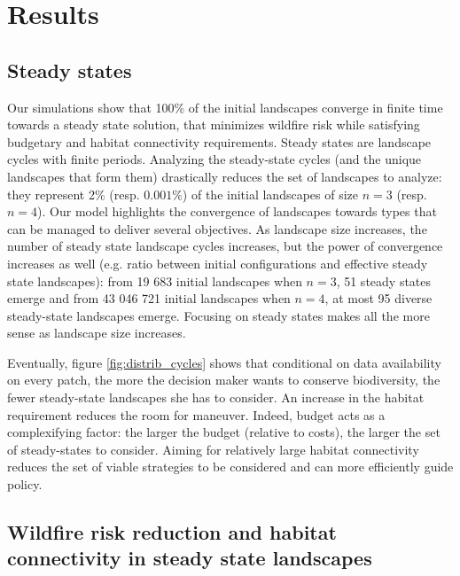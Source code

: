 \section{Results}\label{section:results}

\subsection{Steady states}
Our simulations show that 100\% of the initial landscapes converge in finite time towards a steady state solution, that minimizes wildfire risk while satisfying budgetary and habitat connectivity requirements. Steady states are landscape cycles with finite periods. Analyzing the steady-state cycles (and the unique landscapes that form them) drastically reduces the set of landscapes to analyze: they represent 2\% (resp. $0.001\%$) of the initial landscapes of size $n=3$ (resp. $n=4$). Our model highlights the convergence of landscapes towards types that can be managed to deliver several objectives. As landscape size increases, the number of steady state landscape cycles increases, but the power of convergence increases as well (e.g. ratio between initial configurations and effective steady state landscapes): from 19 683 initial landscapes when $n=3$, 51 steady states emerge and from 43 046 721 initial landscapes when $n=4$, at most 95 diverse steady-state landscapes emerge. Focusing on steady states makes all the more sense as landscape size increases. 

Eventually, figure \ref{fig:distrib_cycles} shows that conditional on data availability on every patch, the more the decision maker wants to conserve biodiversity, the fewer steady-state landscapes she has to consider. An increase in the habitat requirement reduces the room for maneuver. Indeed, budget acts as a complexifying factor: the larger the budget (relative to costs), the larger the set of steady-states to consider. 
Aiming for relatively large habitat connectivity reduces the set of viable strategies to be considered and can more efficiently guide policy. 

\subsection{Wildfire risk reduction and habitat connectivity in steady state landscapes}

